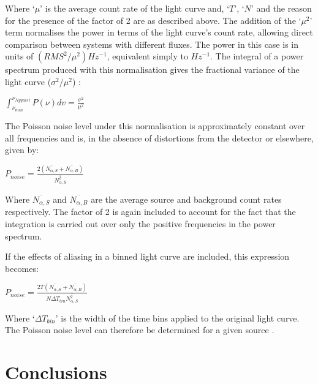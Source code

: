 \documentclass[letters,useAMS,usenatbib]{samnote}
\begin{document}
\setlength\parindent{0pt}
Where `$\mu$' is the average count rate of the light curve and, `$T$', `$N$' and the reason for the presence of the factor of 2 are as described above. The addition of the `$\mu^2$' term normalises the power in terms of the light curve's count rate, allowing direct comparison between systems with different fluxes. The power in this case is in units of $(RMS^2 / \mu^2) Hz^{-1}$, equivalent simply to $Hz^{-1}$. The integral of a power spectrum produced with this normalisation gives the fractional variance of the light curve ($\sigma^2/\mu^2$) \citep{vanderklis}:

\vspace{\baselineskip}
\setlength\parindent{20pt}
$\displaystyle\int_{\nu_{min}}^{\nu_{Nyquist}} P(\nu) dv = \displaystyle\frac{\sigma^2}{\mu^2}$
\vspace{\baselineskip}

\setlength\parindent{0pt}
The Poisson noise level under this normalisation is approximately constant over all frequencies and is, in the absence of distortions from the detector or elsewhere, given by:

\vspace{\baselineskip}
\setlength\parindent{20pt}
$ P_{noise} = \displaystyle\frac{2 ( \overline{N_{\alpha, S}} 
+ \overline{N_{\alpha, B}} ) }{\overline{N_{\alpha, S}^2}} $
\vspace{\baselineskip}

\setlength\parindent{0pt}
Where $\overline{N_{\alpha, S}}$ and $\overline{N_{\alpha, B}}$ are the average source and background count rates respectively. The factor of 2 is again included to account for the fact that the integration is carried out over only the positive frequencies in the power spectrum.

\setlength\parindent{20pt}
If the effects of aliasing in a binned light curve are included, this expression becomes:

\vspace{\baselineskip}
$ P_{noise} = \displaystyle\frac{2 T ( \overline{N_{\alpha, S}} 
+ \overline{N_{\alpha, B}} ) }{N \Delta T_{bin} \overline{N_{\alpha, S}^2}} $
\vspace{\baselineskip}

\setlength\parindent{0pt}
Where `$\Delta T_{bin}$' is the width of the time bins applied to the original light curve. The Poisson noise level can therefore be determined for a given source \citep{summons}.

\section{Conclusions}
\end{document}
